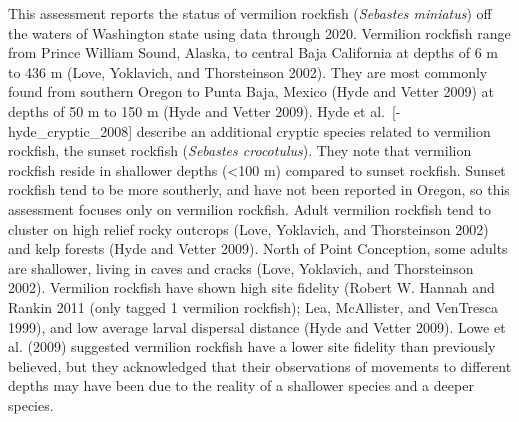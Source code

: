 \documentclass[11pt,
  english,
  a4paper,
]{article}
\begin{document}
This assessment reports the status of vermilion rockfish (\emph{Sebastes miniatus}) off the waters of Washington state using data through 2020. Vermilion rockfish range from Prince William Sound, Alaska, to central Baja California at depths of 6 m to 436 m {(Love, Yoklavich, and Thorsteinson 2002)\leavevmode\tagmcend\tagstructend}. They are most commonly found from southern Oregon to Punta Baja, Mexico {(Hyde and Vetter 2009)\leavevmode\tagmcend\tagstructend} at depths of 50 m to 150 m {(Hyde and Vetter 2009)\leavevmode\tagmcend\tagstructend}. Hyde et al.~{[}-hyde\_cryptic\_2008{]} describe an additional cryptic species related to vermilion rockfish, the sunset rockfish (\emph{Sebastes crocotulus}). They note that vermilion rockfish reside in shallower depths (\textless100 m) compared to sunset rockfish. Sunset rockfish tend to be more southerly, and have not been reported in Oregon, so this assessment focuses only on vermilion rockfish. Adult vermilion rockfish tend to cluster on high relief rocky outcrops {(Love, Yoklavich, and Thorsteinson 2002)\leavevmode\tagmcend\tagstructend} and kelp forests {(Hyde and Vetter 2009)\leavevmode\tagmcend\tagstructend}. North of Point Conception, some adults are shallower, living in caves and cracks {(Love, Yoklavich, and Thorsteinson 2002)\leavevmode\tagmcend\tagstructend}. Vermilion rockfish have shown high site fidelity {(Robert W. Hannah and Rankin 2011 (only tagged 1 vermilion rockfish); Lea, McAllister, and VenTresca 1999)\leavevmode\tagmcend\tagstructend}, and low average larval dispersal distance {(Hyde and Vetter 2009)\leavevmode\tagmcend\tagstructend}. Lowe et al. {(2009)\leavevmode\tagmcend\tagstructend} suggested vermilion rockfish have a lower site fidelity than previously believed, but they acknowledged that their observations of movements to different depths may have been due to the reality of a shallower species and a deeper species.

\leavevmode\tagmcend\tagstructend\par

\end{document}
